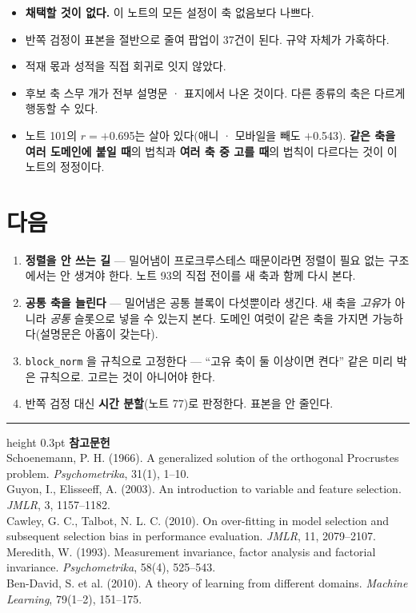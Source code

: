 \documentclass[10pt]{article}
\begin{document}
\begin{itemize}[leftmargin=1.1em,itemsep=0.15em]
\item \textbf{채택할 것이 없다.} 이 노트의 모든 설정이 축 없음보다 나쁘다.
\item 반쪽 검정이 표본을 절반으로 줄여 팝업이 37건이 된다. 규약 자체가
      가혹하다.
\item 적재 몫과 성적을 직접 회귀로 잇지 않았다.
\item 후보 축 스무 개가 전부 설명문 · 표지에서 나온 것이다. 다른 종류의
      축은 다르게 행동할 수 있다.
\item 노트 101의 $r{=}+$0.695는 살아 있다(애니 · 모바일을 빼도 $+$0.543).
      \textbf{같은 축을 여러 도메인에 붙일 때}의 법칙과 \textbf{여러 축 중
      고를 때}의 법칙이 다르다는 것이 이 노트의 정정이다.
\end{itemize}

\section{다음}

\begin{enumerate}[leftmargin=1.3em,itemsep=0.15em]
\item \textbf{정렬을 안 쓰는 길} --- 밀어냄이 프로크루스테스 때문이라면
      정렬이 필요 없는 구조에서는 안 생겨야 한다. 노트 93의 직접 전이를
      새 축과 함께 다시 본다.
\item \textbf{공통 축을 늘린다} --- 밀어냄은 공통 블록이 다섯뿐이라 생긴다.
      새 축을 \emph{고유}가 아니라 \emph{공통} 슬롯으로 넣을 수 있는지 본다.
      도메인 여럿이 같은 축을 가지면 가능하다(설명문은 아홉이 갖는다).
\item \texttt{block\_norm} 을 규칙으로 고정한다 --- ``고유 축이 둘 이상이면
      켠다'' 같은 미리 박은 규칙으로. 고르는 것이 아니어야 한다.
\item 반쪽 검정 대신 \textbf{시간 분할}(노트 77)로 판정한다. 표본을 안 줄인다.
\end{enumerate}

\vspace{0.6em}
\hrule height 0.3pt
\vspace{0.5em}
{\footnotesize
\textbf{참고문헌}\\[0.3em]
Schoenemann, P. H. (1966). A generalized solution of the orthogonal Procrustes
problem. \emph{Psychometrika}, 31(1), 1--10.\\[0.15em]
Guyon, I., Elisseeff, A. (2003). An introduction to variable and feature
selection. \emph{JMLR}, 3, 1157--1182.\\[0.15em]
Cawley, G. C., Talbot, N. L. C. (2010). On over-fitting in model selection and
subsequent selection bias in performance evaluation. \emph{JMLR}, 11, 2079--2107.\\[0.15em]
Meredith, W. (1993). Measurement invariance, factor analysis and factorial
invariance. \emph{Psychometrika}, 58(4), 525--543.\\[0.15em]
Ben-David, S. et al. (2010). A theory of learning from different domains.
\emph{Machine Learning}, 79(1--2), 151--175.
}
\end{document}
